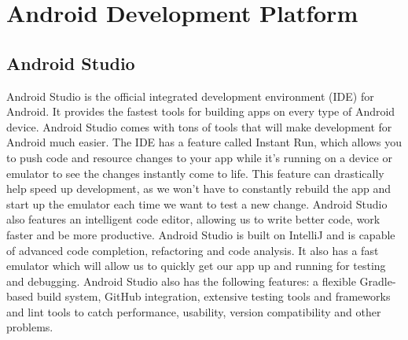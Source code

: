 \documentclass[letterpaper,10pt,draftclsnofoot,onecolumn,titlepage]{IEEEtran}
\begin{document}
	\section{Android Development Platform}
		\subsection{Android Studio}
			Android Studio is the official integrated development environment (IDE) for Android. \cite{AndroidStudio}
			It provides the fastest tools for building apps on every type of Android device.
			Android Studio comes with tons of tools that will make development for Android much easier.
			The IDE has a feature called Instant Run, which allows you to push code and resource changes to your app while it's running on a device or emulator to see the changes instantly come to life.
			This feature can drastically help speed up development, as we won't have to constantly rebuild the app and start up the emulator each time we want to test a new change.
			Android Studio also features an intelligent code editor, allowing us to write better code, work faster and be more productive.
			Android Studio is built on IntelliJ and is capable of advanced code completion, refactoring and code analysis.
			It also has a fast emulator which will allow us to quickly get our app up and running for testing and debugging.
			Android Studio also has the following features: a flexible Gradle-based build system, GitHub integration, extensive testing tools and frameworks and lint tools to catch performance, usability, version compatibility and other problems.
\end{document}
